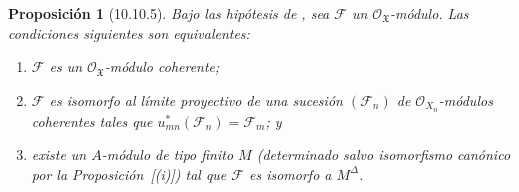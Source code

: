 \documentclass[oneside]{amsart}
\theoremstyle{ega-env-style}
\theoremstyle{ega-thm-env-style}
\newtheorem*{proposition}{Proposición}
\theoremstyle{ega-defn-env-style}
\let\EGAOriginalLabel\label
\renewcommand{\label}[1]{\phantomsection\EGAOriginalLabel{#1}}
\begin{document}
\begin{proposition}[10.10.5]
\label{I.10.10.5}
Bajo las hipótesis de , sea $\mathscr{F}$ un $\mathscr{O}_{\mathfrak{X}}$-módulo.
Las condiciones siguientes son equivalentes:
\begin{enumerate}
  \item[\textup{a)}] $\mathscr{F}$ es un $\mathscr{O}_{\mathfrak{X}}$-módulo coherente;
  \item[\textup{b)}] $\mathscr{F}$ es isomorfo al límite proyectivo  de una sucesión $(\mathscr{F}_n)$ de $\mathscr{O}_{X_n}$-módulos coherentes tales que $u_{mn}^*(\mathscr{F}_n)=\mathscr{F}_m$; y
  \item[\textup{c)}] existe un $A$-módulo de tipo finito $M$ (determinado salvo isomorfismo canónico por la Proposición~[(i)]) tal que $\mathscr{F}$ es isomorfo a $M^\Delta$.
\end{enumerate}
\end{proposition}
\end{document}
